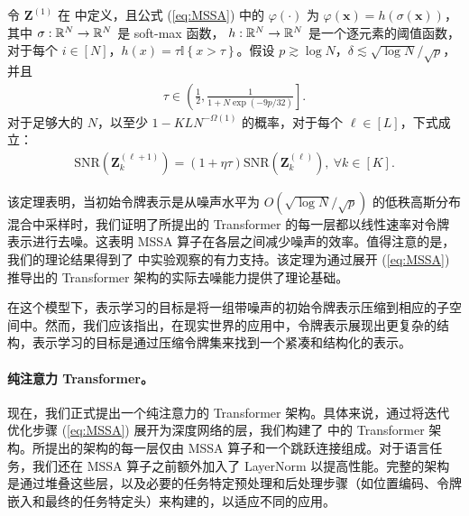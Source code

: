 \documentclass[../../book-main.tex]{subfiles}
\begin{document}
\begin{theorem}\label{thm:1}
令 $\bm Z^{(1)}$ 在  中定义，且公式 (\ref{eq:MSSA}) 中的 $\varphi(\cdot)$ 为
$\varphi(\bm x) = h\left(\sigma(\bm x)\right)$，
其中 $\sigma:\mathbb{R}^N \to \mathbb{R}^N$ 是 soft-max 函数， $h:\mathbb{R}^N \to \mathbb{R}^N$ 是一个逐元素的阈值函数，对于每个 $i \in [N]$，$h(x) = \tau \mathbb{I}\left\{x > \tau\right\}$。假设 $p \gtrsim \log N$，$\delta \lesssim \sqrt{\log N}/\sqrt{p}$，并且
\begin{align*}
\tau \in \left( \frac{1}{2},  \frac{1}{1+N\exp(-9p/32)} \right].
\end{align*}
对于足够大的 $N$，以至少 $1-KLN^{-\Omega(1)}$ 的概率，对于每个 $\ell \in [L]$，下式成立：
    \begin{align}\label{eq:SNR}
        \mathrm{SNR}(\bm Z_k^{(\ell+1)}) = (1+\eta\tau) \mathrm{SNR}(\bm Z_k^{(\ell)}),\ \forall k \in [K].
    \end{align}
\end{theorem}
该定理表明，当初始令牌表示是从噪声水平为 $O(\sqrt{\log N}/\sqrt{p})$ 的低秩高斯分布混合中采样时，我们证明了所提出的 Transformer 的每一层都以线性速率对令牌表示进行去噪。这表明 MSSA 算子在各层之间减少噪声的效率。值得注意的是，我们的理论结果得到了  中实验观察的有力支持。该定理为通过展开 (\ref{eq:MSSA}) 推导出的 Transformer 架构的实际去噪能力提供了理论基础。

\begin{remark}
    在这个模型下，表示学习的目标是将一组带噪声的初始令牌表示压缩到相应的子空间中。然而，我们应该指出，在现实世界的应用中，令牌表示展现出更复杂的结构，表示学习的目标是通过压缩令牌集来找到一个紧凑和结构化的表示。
\end{remark}


\paragraph{纯注意力 Transformer。} 现在，我们正式提出一个纯注意力的 Transformer 架构。具体来说，通过将迭代优化步骤 (\ref{eq:MSSA}) 展开为深度网络的层，我们构建了  中的 Transformer 架构。所提出的架构的每一层仅由 MSSA 算子和一个跳跃连接组成。对于语言任务，我们还在 MSSA 算子之前额外加入了 LayerNorm 以提高性能。完整的架构是通过堆叠这些层，以及必要的任务特定预处理和后处理步骤（如位置编码、令牌嵌入和最终的任务特定头）来构建的，以适应不同的应用。
\end{document}
